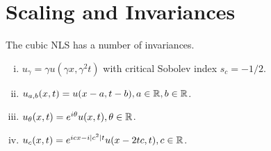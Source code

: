 \section{Scaling and Invariances}
The cubic NLS has a number of invariances. 
\begin{enumerate}[(i)]
  \item{ $u_{\gamma} = \gamma u(\gamma x, \gamma^{2} t)$ with critical Sobolev index
    $s_{c} = -1/2$}.
    \label{pinvar-it-1}
  \item{ $u_{a,b}(x,t) = u(x -a, t - b), a \in \mathbb{R}, b \in \mathbb{R}$}.
    \label{pinvar-it-2}
  \item{ $u_{\theta}(x,t) = e^{i \theta} u(x, t), \theta \in \mathbb{R}$}.
    \label{pinvar-it-3}
  \item{ $u_{c}(x,t) = e^{icx - i| c^{2} |t}u(x -2tc, t), c \in \mathbb{R}$}.
    \label{pinvar-it-4}
\end{enumerate}
%
%
